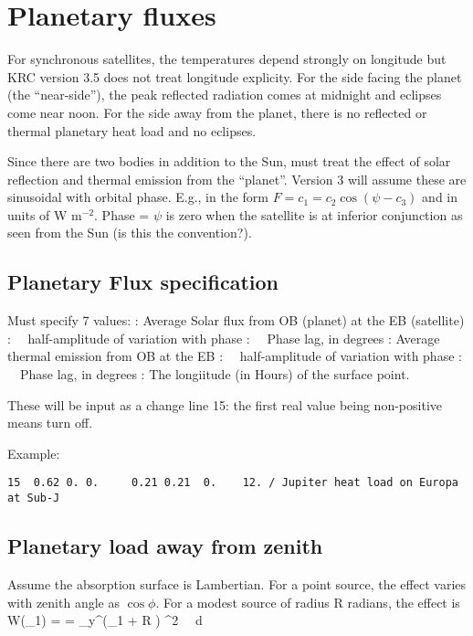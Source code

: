 \documentclass{article}
\begin{document}
\section{Planetary fluxes}

For synchronous satellites, the temperatures depend strongly on longitude but
KRC version 3.5 does not treat longitude explicity.  For the side facing the
planet (the ``near-side''), the peak reflected radiation comes at midnight and
eclipses come near noon. For the side away from the planet, there is no
reflected or thermal planetary heat load and no eclipses.

Since there are two bodies in addition to the Sun, must treat the effect of
solar reflection and thermal emission from the ``planet''.  Version 3 will
assume these are sinusoidal with orbital phase. 
E.g., in the form $F=c_1 = c_2 \cos (\psi -c_3)$ 
and in units of W m$^{-2}$. Phase = $\psi$ is zero when the satellite is at
inferior conjunction as seen from the Sun (is this the convention?). 

\subsection{Planetary Flux specification \label{pline}}

Must specify 7 values:
: Average Solar flux from OB (planet) at the EB (satellite)
: \ \ half-amplitude of variation with phase
: \  \ Phase lag, in degrees
: Average thermal emission from OB at the EB
:  \ \ half-amplitude of variation with phase
:  \ \ Phase lag, in degrees
: The longiitude (in Hours)  of the surface point.
 
These will be input as a change line 15: the first real value being non-positive
means turn off.  

Example: \vspace{-3.mm} 
\begin{verbatim}
15  0.62 0. 0.     0.21 0.21  0.    12. / Jupiter heat load on Europa at Sub-J
\end{verbatim} 

\subsection{Planetary load away from zenith}
Assume the absorption surface is Lambertian. For a point source, the effect varies
with zenith angle as $\cos \phi$. For a modest source of radius R radians, the
effect is
\qbn W(\phi_1) = 
 =  \int_y^\pi \cos (\phi_1 + R \cos \theta ) \cdot  \sin^2 \theta \ \ d \theta \qen
\end{document}
